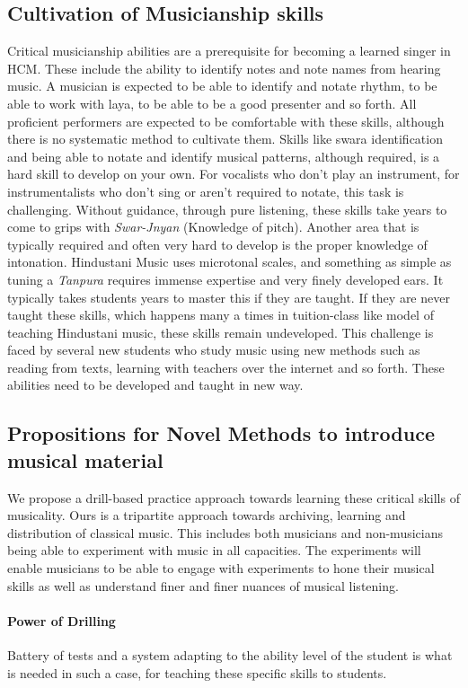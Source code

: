 \documentclass{tufte-handout}
\begin{document}
\subsection{Cultivation of Musicianship skills} Critical musicianship abilities are a prerequisite for becoming a learned singer in HCM. These include the ability to identify notes and note names from hearing music. A musician is expected to be able to identify and notate rhythm, to be able to work with laya, to be able to be a good presenter and so forth. All proficient performers are expected to be comfortable with these skills, although there is no systematic method to cultivate them. Skills like swara identification and being able to notate and identify musical patterns, although required, is a hard skill to develop on your own. For vocalists who don't play an instrument, for instrumentalists who don't sing or aren't required to notate, this task is challenging. Without guidance, through pure listening, these skills take years to come to grips with \textit{Swar-Jnyan} (Knowledge of pitch). Another area that is typically required and often very hard to develop is the proper knowledge of intonation. Hindustani Music uses microtonal scales, and something as simple as tuning a \textit{Tanpura} requires immense expertise and very finely developed ears. It typically takes students years to master this if they are taught. If they are never taught these skills, which happens many a times in tuition-class like model of teaching Hindustani music, these skills remain undeveloped. This challenge is faced by several new students who study music using new methods such as reading from texts, learning with teachers over the internet and so forth. These abilities need to be developed and taught in new way. 

\subsection{Propositions for Novel Methods to introduce musical material}
We propose a drill-based practice approach towards learning these critical skills of musicality.
Ours is a tripartite approach towards archiving, learning and distribution of classical music. This includes both musicians and non-musicians being able to experiment with music in all capacities. The experiments will enable musicians to be able to engage with experiments to hone their musical skills as well as understand finer and finer nuances of musical listening. 
\paragraph{Power of Drilling} Battery of tests and a system adapting to the ability level of the student is what is needed in such a case, for teaching these specific skills to students. 
\end{document}

